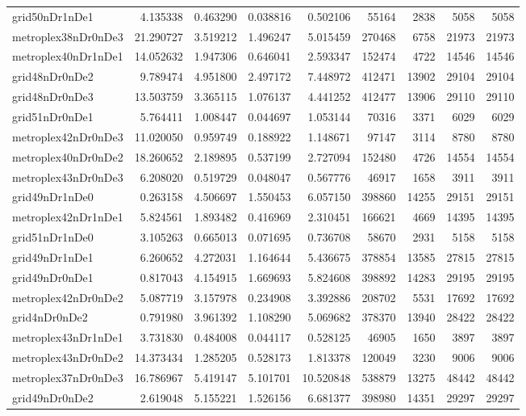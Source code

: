 \begin{longtable}{|l|r|r|r|r|r|r|r|r|}
grid50nDr1nDe1 & 4.135338 & 0.463290 & 0.038816 & 0.502106 & 55164 & 2838 & 5058 & 5058 \\
metroplex38nDr0nDe3 & 21.290727 & 3.519212 & 1.496247 & 5.015459 & 270468 & 6758 & 21973 & 21973 \\
metroplex40nDr1nDe1 & 14.052632 & 1.947306 & 0.646041 & 2.593347 & 152474 & 4722 & 14546 & 14546 \\
grid48nDr0nDe2 & 9.789474 & 4.951800 & 2.497172 & 7.448972 & 412471 & 13902 & 29104 & 29104 \\
grid48nDr0nDe3 & 13.503759 & 3.365115 & 1.076137 & 4.441252 & 412477 & 13906 & 29110 & 29110 \\
grid51nDr0nDe1 & 5.764411 & 1.008447 & 0.044697 & 1.053144 & 70316 & 3371 & 6029 & 6029 \\
metroplex42nDr0nDe3 & 11.020050 & 0.959749 & 0.188922 & 1.148671 & 97147 & 3114 & 8780 & 8780 \\
metroplex40nDr0nDe2 & 18.260652 & 2.189895 & 0.537199 & 2.727094 & 152480 & 4726 & 14554 & 14554 \\
metroplex43nDr0nDe3 & 6.208020 & 0.519729 & 0.048047 & 0.567776 & 46917 & 1658 & 3911 & 3911 \\
grid49nDr1nDe0 & 0.263158 & 4.506697 & 1.550453 & 6.057150 & 398860 & 14255 & 29151 & 29151 \\
metroplex42nDr1nDe1 & 5.824561 & 1.893482 & 0.416969 & 2.310451 & 166621 & 4669 & 14395 & 14395 \\
grid51nDr1nDe0 & 3.105263 & 0.665013 & 0.071695 & 0.736708 & 58670 & 2931 & 5158 & 5158 \\
grid49nDr1nDe1 & 6.260652 & 4.272031 & 1.164644 & 5.436675 & 378854 & 13585 & 27815 & 27815 \\
grid49nDr0nDe1 & 0.817043 & 4.154915 & 1.669693 & 5.824608 & 398892 & 14283 & 29195 & 29195 \\
metroplex42nDr0nDe2 & 5.087719 & 3.157978 & 0.234908 & 3.392886 & 208702 & 5531 & 17692 & 17692 \\
grid4nDr0nDe2 & 0.791980 & 3.961392 & 1.108290 & 5.069682 & 378370 & 13940 & 28422 & 28422 \\
metroplex43nDr1nDe1 & 3.731830 & 0.484008 & 0.044117 & 0.528125 & 46905 & 1650 & 3897 & 3897 \\
metroplex43nDr0nDe2 & 14.373434 & 1.285205 & 0.528173 & 1.813378 & 120049 & 3230 & 9006 & 9006 \\
metroplex37nDr0nDe3 & 16.786967 & 5.419147 & 5.101701 & 10.520848 & 538879 & 13275 & 48442 & 48442 \\
grid49nDr0nDe2 & 2.619048 & 5.155221 & 1.526156 & 6.681377 & 398980 & 14351 & 29297 & 29297 \\

\end{longtable}
